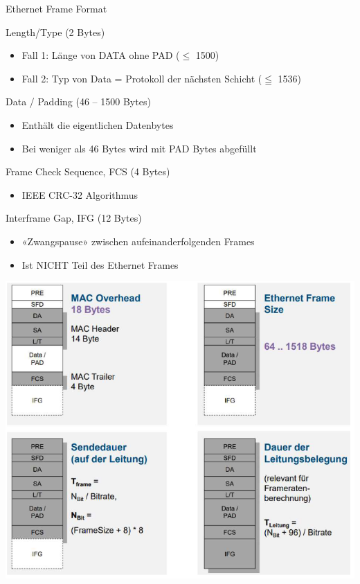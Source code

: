 \begin{definition}{Ethernet Frame Format}
\begin{minipage}{0.7\linewidth}
    Length/Type (2 Bytes)
    \begin{itemize}
        \item Fall 1: Länge von DATA ohne PAD ($\leq$ 1500)
        \item Fall 2: Typ von Data = Protokoll der nächsten Schicht ($\leqq$ 1536)
    \end{itemize}
    Data / Padding (46 – 1500 Bytes)
    \begin{itemize}
        \item Enthält die eigentlichen Datenbytes
        \item Bei weniger als 46 Bytes wird mit PAD Bytes abgefüllt
    \end{itemize}
    Frame Check Sequence, FCS (4 Bytes)
    \begin{itemize}
        \item IEEE CRC-32 Algorithmus
    \end{itemize}
    Interframe Gap, IFG (12 Bytes)
    \begin{itemize}
        \item «Zwangspause» zwischen aufeinanderfolgenden Frames
        \item Ist NICHT Teil des Ethernet Frames
    \end{itemize}
    \end{minipage}
    \vspace{2mm}        
    \includegraphics[width=1\linewidth]{images/ethernet_frame_details.png}
\end{definition}

